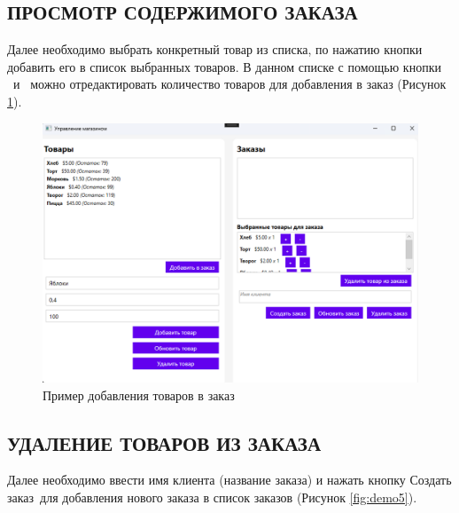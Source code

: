 \documentclass[12pt]{article}
\renewcommand{\texttt}[1]{{\small\ttfamily #1}}
\begin{document}
\pagebreak

\subsection{ПРОСМОТР СОДЕРЖИМОГО ЗАКАЗА}

Далее необходимо выбрать конкретный товар из списка, по нажатию кнопки добавить его в список выбранных товаров. В данном списке с помощью кнопки \guillemotleft\texttt{+}\guillemotright \ и \guillemotleft\texttt{-}\guillemotright \ можно отредактировать количество товаров для добавления в заказ (Рисунок \ref{fig:demo4}).


\begin{figure}[ht]
	\centering
	\includegraphics[width=1.0\textwidth]{fig/image 61.png}
	\caption{Пример добавления товаров в заказ} %
	\label{fig:demo4}
\end{figure}

\pagebreak

\subsection{УДАЛЕНИЕ ТОВАРОВ ИЗ ЗАКАЗА}

Далее необходимо ввести имя клиента (название заказа) и нажать кнопку \guillemotleft Создать заказ\guillemotright \ для добавления нового заказа в список заказов (Рисунок \ref{fig:demo5}).
\end{document}
